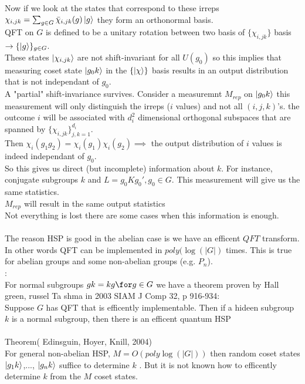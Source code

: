 \documentclass{article}
\begin{document}
{$$        $$
Now if we look at the states that correspond to these irreps $\chi_{i,jk} = \sum_{g\in G} \bar{\chi}_{i,jk} (g) \ket{g}$ they form an orthonormal basis.\\
QFT on $G$ is defined to be a unitary rotation between two basis of $\{ \chi_{i,jk} \}$ basis $\rightarrow \{ \ket{g} \}_{g \in G}$.\\
These states $\ket{\chi_{i,jk}}$ are not shift-invariant for all $U(g_0)$ so this implies that measuring coset state $\ket{g_0 k}$ in the $\{ \ket{\chi}\}$ basis results in an output distribution that is not independant of $g_0$.\\
A "partial" shift-invariance survives. Consider a measuremnt $M_{rep}$ on $\ket{g_0 k}$ this measurement will only distinguish the irreps ($i$ values) and not all $(i,j,k)$'s. the outcome $i$ will be associated with $d_i^2$ dimensional orthogonal subspaces that are spanned by $\{\chi_{i,jk}\}_{j,k = 1}^{d_i}$.\\
Then $\chi_i(g_1 g_2) = \chi_i(g_1) \chi_i(g_2) \implies$ the output distribution of $i$ values is indeed independant of $g_0$.\\
So this gives us direct (but incomplete) information about $k$. For instance, conjugate subgroups $k$ and $L = g_0 K g_0', g_0 \in G$. This measurement will give us the same statistics.\\
$M_{rep}$ will result in the same output statistics\\
Not everything is lost there are some cases when this information is enough.\\\\
The reason HSP is good in the abelian case is we have an efficent $QFT$ transform. In other words QFT can be implemented in $poly(\log(|G|)$ times. This is true for abelian groups and some non-abelian groups (e.g. $P_n$).\\
:\\
For normal subgroups $gk = kg \for g \in G$ we have a theorem proven by Hall green, russel Ta shma in 2003 SIAM J Comp 32, p 916-934:\\
Suppose $G$ has QFT that is efficently implementable. Then if a hideen subgroup $k$ is a normal subgroup, then there is an efficent quantum HSP\\\\
Theorem( Edinsguin, Hoyer, Knill, 2004)\\
For general non-abelian HSP, $M = O(poly \log(|G|))$ then random coset states $\ket{g_1k}$,..., $\ket{g_nk}$ suffice to determine $k$ . But it is not known how to efficently determine $k$ from the $M$ coset states.
}
\end{document}
